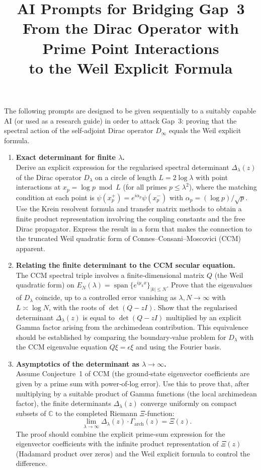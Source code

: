 \documentclass[12pt,a4paper]{article}
\title{\bf AI Prompts for Bridging Gap~3\\
\large From the Dirac Operator with Prime Point Interactions\\
to the Weil Explicit Formula}
\author{}
\date{}
\begin{document}
\maketitle

The following prompts are designed to be given sequentially to a suitably capable AI (or used as a research guide) in order to attack Gap~3: proving that the spectral action of the self‑adjoint Dirac operator \(D_\infty\) equals the Weil explicit formula.

\begin{enumerate}[leftmargin=*,label=\textbf{Prompt \arabic*:},ref=Prompt \arabic*]

\item \textbf{Exact determinant for finite \(\lambda\).}\\
Derive an explicit expression for the regularised spectral determinant \(\Delta_\lambda(z)\) of the Dirac operator \(D_\lambda\) on a circle of length \(L = 2\log\lambda\) with point interactions at \(x_p = \log p \bmod L\) (for all primes \(p \le \lambda^2\)), where the matching condition at each point is \(\psi(x_p^+) = e^{i\alpha_p}\psi(x_p^-)\) with \(\alpha_p = (\log p)/\sqrt{p}\).
Use the Krein resolvent formula and transfer matrix methods to obtain a finite product representation involving the coupling constants and the free Dirac propagator.
Express the result in a form that makes the connection to the truncated Weil quadratic form of Connes--Consani--Moscovici (CCM) apparent.

\item \textbf{Relating the finite determinant to the CCM secular equation.}\\
The CCM spectral triple involves a finite‑dimensional matrix \(Q\) (the Weil quadratic form) on \(E_N(\lambda) = \operatorname{span}\{e^{i\mu_k x}\}_{|k|\le N}\).
Prove that the eigenvalues of \(D_\lambda\) coincide, up to a controlled error vanishing as \(\lambda, N\to\infty\) with \(L\asymp\log N\), with the roots of \(\det(Q - zI)\).
Show that the regularised determinant \(\Delta_\lambda(z)\) is equal to \(\det(Q - zI)\) multiplied by an explicit Gamma factor arising from the archimedean contribution.
This equivalence should be established by comparing the boundary‑value problem for \(D_\lambda\) with the CCM eigenvalue equation \(Q\xi = \epsilon\xi\) and using the Fourier basis.

\item \textbf{Asymptotics of the determinant as \(\lambda\to\infty\).}\\
Assume Conjecture~1 of CCM (the ground‑state eigenvector coefficients are given by a prime sum with power‑of‑log error).
Use this to prove that, after multiplying by a suitable product of Gamma functions (the local archimedean factor), the finite determinants \(\Delta_\lambda(z)\) converge uniformly on compact subsets of \(\mathbb{C}\) to the completed Riemann \(\Xi\)-function:
\[
\lim_{\lambda\to\infty} \Delta_\lambda(z) \cdot \Gamma_{\text{arch}}(z) = \Xi(z).
\]
The proof should combine the explicit prime‑sum expression for the eigenvector coefficients with the infinite product representation of \(\Xi(z)\) (Hadamard product over zeros) and the Weil explicit formula to control the difference.


\end{enumerate}
\end{document}
